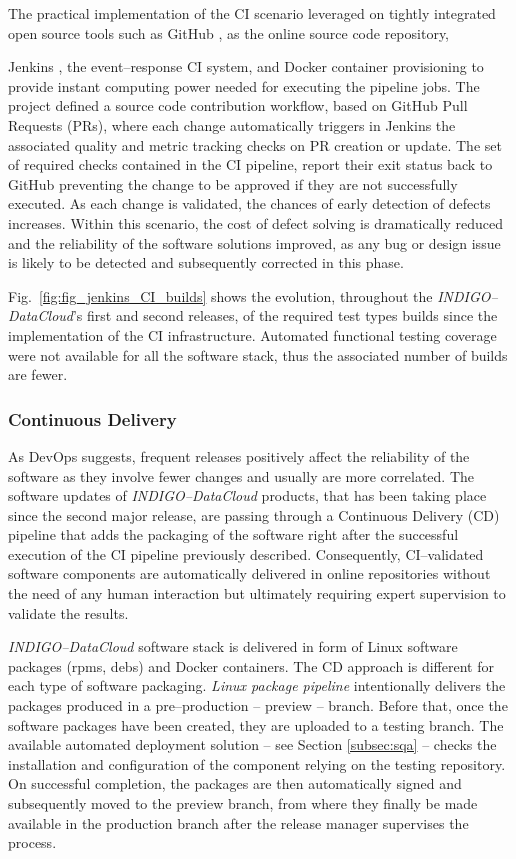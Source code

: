 \documentclass[journal]{IEEEtran}
\begin{document}
The practical implementation of the CI scenario leveraged on tightly integrated open
source tools such as GitHub \cite{github}, as the online source code repository,

Jenkins \cite{jenkins}, the event--response CI system, and Docker container
provisioning to provide instant computing power needed for executing the pipeline jobs.
The project defined a source code contribution workflow, based on GitHub Pull Requests
(PRs), where each change automatically triggers in Jenkins the associated quality and
metric tracking checks on PR creation or update. The set of required checks contained
in the CI pipeline, report their exit status back to GitHub preventing the change to be
approved if they are not successfully executed. As each change is validated, the chances
of early detection of defects increases. Within this scenario, the cost of defect solving
is dramatically reduced and the reliability of the software solutions improved, as any
bug or design issue is likely to be detected and subsequently corrected in this phase.

Fig.~\ref{fig:fig_jenkins_CI_builds} shows the evolution, throughout the
{\sl INDIGO--DataCloud}'s first and second releases, of the required test types builds since the
implementation of the CI infrastructure. Automated functional testing coverage were not
available for all the software stack, thus the associated number of builds are fewer.

\subsubsection{Continuous Delivery}
As DevOps suggests, frequent releases positively affect the reliability of the software as
they involve fewer changes and usually are more correlated. The software updates of
{\sl INDIGO--DataCloud} products, that has been taking place since the second major release, are passing through
a Continuous Delivery (CD) pipeline that adds the packaging of the software right after the
successful execution of the CI pipeline previously described. Consequently, CI--validated
software components are automatically delivered in online repositories without the need of
any human interaction but ultimately requiring expert supervision to validate the results.

{\sl INDIGO--DataCloud} software stack is delivered in form of Linux software packages (rpms, debs)
and Docker containers. The CD approach is different for each type of software packaging. \textit{Linux
package pipeline} intentionally delivers the packages produced in a pre--production -- preview --
branch. Before that, once the software packages have been created, they are uploaded to a
testing branch. The available automated deployment solution -- see Section \ref{subsec:sqa} -- checks
the installation and configuration of the component relying on the testing repository. On
successful completion, the packages are then automatically signed and subsequently moved to
the preview branch, from where they finally be made available in the production branch after
the release manager supervises the process.
\end{document}
